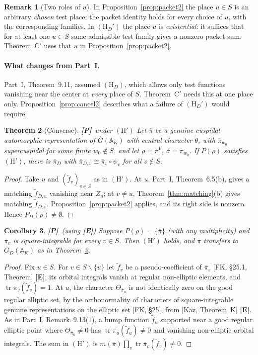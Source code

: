 \documentclass[12pt]{article}
\newcommand{\ov}[1]{\overline{#1}}
\newcommand{\A}{\mathbb{A}}
\newcommand{\tr}{\operatorname{tr}}
\newcommand{\Gb}{\ov{G}}
\newcommand{\Zb}{\ov{Z}}
\newcommand{\GDb}{\ov{G}_D}
\newcommand{\pib}{\ov{\pi}}
\newcommand{\Pv}{\textbf{[P]}}
\newcommand{\Ev}{\textbf{[E]}}
\theoremstyle{plain}
\newtheorem{theorem}{Theorem}[section]
\newtheorem{corollary}[theorem]{Corollary}
\theoremstyle{definition}
\newtheorem{remark}[theorem]{Remark}
\begin{document}
\begin{remark}[Two roles of $u$]
In Proposition~\ref{prop:packet2} the place $u\in S$ is an arbitrary \emph{chosen} test place: the packet identity holds for every choice of $u$, with the corresponding families. In $(\mathrm H_D')$ the place $u$ is \emph{existential}: it suffices that for at least one $u\in S$ some admissible test family gives a nonzero packet sum. Theorem~C$'$ uses that $u$ in Proposition~\ref{prop:packet2}.
\end{remark}

\paragraph{What changes from Part~I.} Part~I, Theorem~9.11, assumed $(\mathrm H_D)$, which allows only test functions vanishing near the center at \emph{every} place of $S$. Theorem~C$'$ needs this at one place only. Proposition~\ref{prop:cancel2} describes what a failure of $(\mathrm H_D')$ would require.

\begin{theorem}[Converse]\label{thm:Cprimeconv}\Pv\ under $(\mathrm H')$
Let $\pib$ be a genuine cuspidal automorphic representation of $\Gb(\A_K)$ with central character $\tilde\theta$, with $\pib_{w_0}$ supercuspidal for some finite $w_0\notin S$, and let $\rho=\pib^V$, $\sigma=\pib_{w_0}$. If $P(\rho)$ satisfies $(\mathrm H')$, there is $\pib_D$ with $\pib_{D,v}\cong\pib_v\circ\psi_v$ for all $v\notin S$.
\end{theorem}
\begin{proof}
Take $u$ and $(\tilde f_v)_{v\in S}$ as in $(\mathrm H')$. At $u$, Part~I, Theorem~6.5(b), gives a matching $\tilde f_{D,u}$ vanishing near $\Zb_u$; at $v\ne u$, Theorem~\ref{thm:matching}(b) gives matching $\tilde f_{D,v}$. Proposition~\ref{prop:packet2} applies, and its right side is nonzero. Hence $P_D(\rho)\ne\emptyset$.
\end{proof}

\begin{corollary}\label{cor:Hprimesq}\Pv\ (using \Ev)
Suppose $P(\rho)=\{\pib\}$ (with any multiplicity) and $\pib_v$ is square-integrable for every $v\in S$. Then $(\mathrm H')$ holds, and $\pib$ transfers to $\GDb(\A_K)$ as in Theorem~\ref{thm:Cprimeconv}.
\end{corollary}
\begin{proof}
Fix $u\in S$. For $v\in S\smallsetminus\{u\}$ let $\tilde f_v$ be a pseudo-coefficient of $\pib_v$ [FK, \S25.1, Theorem] \Ev; its orbital integrals vanish at regular non-elliptic elements, and $\tr\pib_v(\tilde f_v)=1$. At $u$, the character $\Theta_{\pib_u}$ is not identically zero on the good regular elliptic set, by the orthonormality of characters of square-integrable genuine representations on the elliptic set [FK, \S25], from [Kaz, Theorem~K] \Ev. As in Part~I, Remark~9.13(1), a bump function $\tilde f_u$ supported near a good regular elliptic point where $\Theta_{\pib_u}\ne0$ has $\tr\pib_u(\tilde f_u)\ne0$ and vanishing non-elliptic orbital integrals. The sum in $(\mathrm H')$ is $m(\pib)\prod_v\tr\pib_v(\tilde f_v)\ne0$.
\end{proof}
\end{document}
